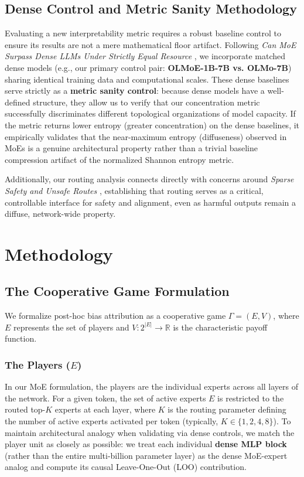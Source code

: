 \documentclass[11pt,a4paper]{article}
\begin{document}
\subsection{Dense Control and Metric Sanity Methodology}
Evaluating a new interpretability metric requires a robust baseline control to ensure its results are not a mere mathematical floor artifact. Following \textit{Can MoE Surpass Dense LLMs Under Strictly Equal Resource} \cite{can_moe_surpass}, we incorporate matched dense models (e.g., our primary control pair: \textbf{OLMoE-1B-7B vs. OLMo-7B}) sharing identical training data and computational scales. These dense baselines serve strictly as a \textbf{metric sanity control}: because dense models have a well-defined structure, they allow us to verify that our concentration metric successfully discriminates different topological organizations of model capacity. If the metric returns lower entropy (greater concentration) on the dense baselines, it empirically validates that the near-maximum entropy (diffuseness) observed in MoEs is a genuine architectural property rather than a trivial baseline compression artifact of the normalized Shannon entropy metric.

Additionally, our routing analysis connects directly with concerns around \textit{Sparse Safety and Unsafe Routes} \cite{sparse_safety_unsafe}, establishing that routing serves as a critical, controllable interface for safety and alignment, even as harmful outputs remain a diffuse, network-wide property.

\section{Methodology}
\subsection{The Cooperative Game Formulation}
We formalize post-hoc bias attribution as a cooperative game $\Gamma = (E, V)$, where $E$ represents the set of players and $V: 2^{|E|} \to \mathbb{R}$ is the characteristic payoff function.

\subsubsection{The Players ($E$)}
In our MoE formulation, the players are the individual experts across all layers of the network. For a given token, the set of active experts $E$ is restricted to the routed top-$K$ experts at each layer, where $K$ is the routing parameter defining the number of active experts activated per token (typically, $K \in \{1, 2, 4, 8\}$). To maintain architectural analogy when validating via dense controls, we match the player unit as closely as possible: we treat each individual \textbf{dense MLP block} (rather than the entire multi-billion parameter layer) as the dense MoE-expert analog and compute its causal Leave-One-Out (LOO) contribution.
\end{document}
